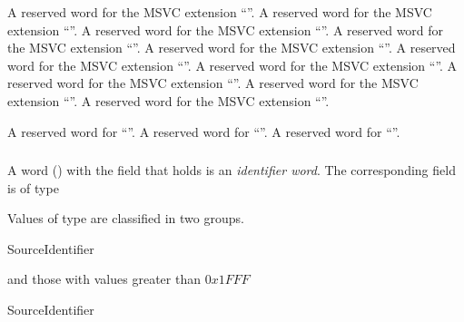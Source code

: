  A reserved word for the MSVC extension ``''.
 A reserved word for the MSVC extension ``''.
 A reserved word for the MSVC extension ``''.
 A reserved word for the MSVC extension ``''.
 A reserved word for the MSVC extension ``''.
 A reserved word for the MSVC extension ``''.
 A reserved word for the MSVC extension ``''.
 A reserved word for the MSVC extension ``''.
 A reserved word for the MSVC extension ``''.
 A reserved word for the MSVC extension ``''.

 A reserved word for ``''.
 A reserved word for ``''.
 A reserved word for ``''.



\subsubsection{}
\label{sec:ifc:WordSort:Identifier}

A word ()  with the  field that holds
 is an \emph{identifier word}.  The corresponding 
 field is of type 

Values of type  are classified in two groups.
\begin{Enumeration}{SourceIdentifier}
\end{Enumeration}
and those with values greater than $0x1FFF$
\begin{Enumeration}{SourceIdentifier}\setcounter{enumi}{8190}
\end{Enumeration}

